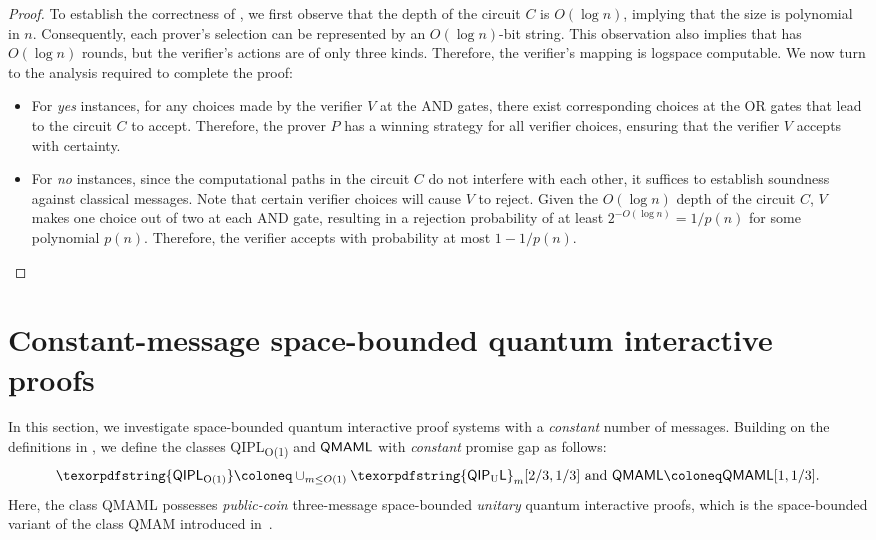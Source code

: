 \documentclass[11pt, a4paper]{article}
\numberwithin{equation}{section}
\numberwithin{figure}{section}
\newcommand{\QMAM}{\textnormal{\textsf{QMAM}}\xspace}
\newcommand{\QMAML}{\textnormal{\textsf{QMAML}}\xspace}
\newcommand{\QIPLconst}{\texorpdfstring{\textnormal{\textsf{QIPL}\textsubscript{O(1)}}}\xspace}
\newcommand{\QIPUL}{\texorpdfstring{\textnormal{\textsf{QIP}\textsubscript{\textnormal{U}}\textsf{L}}}\xspace}
\begin{document}
\begin{proof}
    To establish the correctness of , we first observe that  the depth of the circuit $C$ is $O(\log n)$, implying that the size is polynomial in $n$. Consequently, each prover's selection can be represented by an $O(\log n)$-bit string. 
    This observation also implies that  has $O(\log n)$ rounds, but the verifier's actions are of only three kinds. Therefore, the verifier's mapping is logspace computable. We now turn to the analysis required to complete the proof: 
    \begin{itemize}
        \item For \textit{yes} instances, for any choices made by the verifier $V$ at the AND gates, there exist corresponding choices at the OR gates that lead to the circuit $C$ to accept. Therefore, the prover $P$ has a winning strategy for all verifier choices, ensuring that the verifier $V$ accepts with certainty. 
        \item For \textit{no} instances, since the computational paths in the circuit $C$ do not interfere with each other, it suffices to establish soundness against classical messages. Note that certain verifier choices will cause $V$ to reject. Given the $O(\log n)$ depth of the circuit $C$, $V$ makes one choice out of two at each AND gate, resulting in a rejection probability of at least $2^{-O(\log {n})} = 1/p(n)$ for some polynomial $p(n)$. Therefore, the verifier accepts with probability at most $1-1/p(n)$. \qedhere
    \end{itemize}
\end{proof}

\section{Constant-message space-bounded quantum interactive proofs}
\label{sec:cosnt-message-QIPL}

In this section, we investigate space-bounded quantum interactive proof systems with a \textit{constant} number of messages. Building on the definitions in , we define the classes \QIPLconst{} and $\QMAML$ with \textit{constant} promise gap as follows: 
\begin{equation}
    \label{eq:QIPLconst-defs}
    \QIPLconst \coloneq \cup_{m \leq O(1)} \QIPUL_m[2/3,1/3] \text{ and } \QMAML \coloneq \QMAML[1,1/3].
\end{equation}
Here, the class \QMAML{} possesses \textit{public-coin} three-message space-bounded \textit{unitary} quantum interactive proofs, which is the space-bounded variant of the class \QMAM{} introduced in~\cite{MW05}. 
\end{document}
